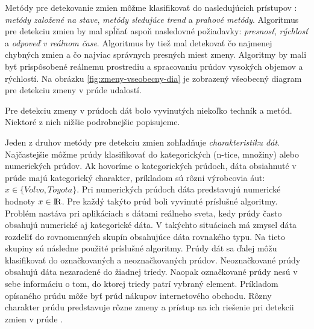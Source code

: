  \par
Metódy pre detekovanie zmien môžme klasifikovať do nasledujúcich prístupov \citep{liu2010mining}: \textit{metódy založené na stave}, \textit{metódy sledujúce trend} a \textit{prahové metódy}. Algoritmus pre detekciu zmien by mal spĺňať aspoň nasledovné požiadavky: \textit{presnosť}, \textit{rýchlosť} a \textit{odpoveď v reálnom čase}. Algoritmus by tiež mal detekovať čo najmenej chybných zmien a čo najviac správnych presných miest zmeny. Algoritmy by mali byť prispôsobené reálnemu prostrediu a spracovaniu prúdov vysokých objemov a rýchlostí. Na obrázku \ref{fig:zmeny-vseobecny-dia} je zobrazený všeobecný diagram pre detekciu zmeny v prúde udalostí.

\label{fig:zmeny-vseobecny-dia}

Pre detekciu zmeny v prúdoch dát bolo vyvinutých niekoľko techník a metód. Niektoré z nich nižšie podrobnejšie popisujeme.

 Jeden z druhov metódy pre detekciu zmien zohľadňuje \textit{charakteristiku dát}. Najčastejšie môžme prúdy klasifikovať do kategorických (n-tice, množiny) alebo numerických prúdov. Ak hovoríme o kategorických prúdoch, dáta obsiahnuté v prúde majú kategorický charakter, príkladom sú rôzni výrobcovia áut: $x \in \{Volvo, Toyota\}$. Pri numerických prúdoch dáta predstavujú numerické hodnoty $x \in {\rm I\!R}$. Pre každý takýto prúd boli vyvinuté príslušné algoritmy. Problém nastáva pri aplikáciach s dátami reálneho sveta, kedy prúdy často obsahujú numerické aj kategorické dáta. V takýchto situáciach má zmysel dáta rozdeliť do rovnomenných skupín obsahujúce dáta rovnakého typu. Na tieto skupiny sú následne použité príslušné algoritmy. Prúdy dát sa ďalej môžu klasifikovať do označkovaných a neoznačkovaných prúdov. Neoznačkované prúdy obsahujú dáta nezaradené do žiadnej triedy. Naopak označkované prúdy nesú v sebe informáciu o tom, do ktorej triedy patrí vybraný element. Príkladom opísaného prúdu môže byť prúd nákupov internetového obchodu. Rôzny charakter prúdu predstavuje rôzne zmeny a prístup na ich riešenie pri detekcii zmien v prúde \citep{tran2014change}.

